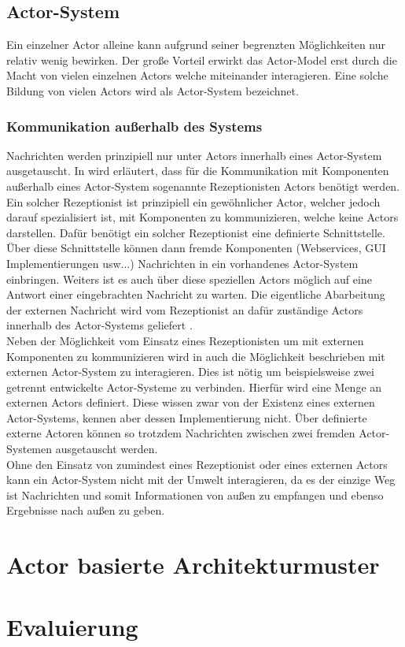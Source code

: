 \subsection{Actor-System}\label{actor:actorSystem}
Ein einzelner Actor alleine kann aufgrund seiner begrenzten Möglichkeiten nur relativ wenig bewirken. Der große Vorteil erwirkt das Actor-Model erst durch die Macht von vielen einzelnen Actors welche miteinander interagieren. Eine solche Bildung von vielen Actors wird als Actor-System bezeichnet.\citep{Agha1985ActorsSystems}
\subsubsection{Kommunikation außerhalb des Systems}
Nachrichten werden prinzipiell nur unter Actors innerhalb eines Actor-System ausgetauscht. In \cite{Agha1985ActorsSystems} wird erläutert, dass für die Kommunikation mit Komponenten außerhalb eines Actor-System sogenannte Rezeptionisten Actors benötigt werden.\\
Ein solcher Rezeptionist ist prinzipiell ein gewöhnlicher Actor, welcher jedoch darauf spezialisiert ist, mit Komponenten  zu kommunizieren, welche keine Actors darstellen. Dafür benötigt ein solcher Rezeptionist eine definierte Schnittstelle. Über diese Schnittstelle können dann fremde Komponenten (Webservices, GUI Implementierungen  usw...) Nachrichten in ein vorhandenes Actor-System einbringen. Weiters ist es auch über diese speziellen Actors möglich auf eine Antwort einer eingebrachten Nachricht zu warten. Die eigentliche Abarbeitung der externen Nachricht wird vom Rezeptionist an dafür zuständige Actors innerhalb des Actor-Systems geliefert \citep{Agha1985ActorsSystems}.\\
Neben der Möglichkeit vom Einsatz eines Rezeptionisten um mit externen Komponenten zu kommunizieren wird in \cite{Agha1985ActorsSystems} auch die Möglichkeit beschrieben mit externen Actor-System zu interagieren. Dies ist nötig um beispielsweise zwei getrennt entwickelte Actor-Systeme zu verbinden. Hierfür wird eine Menge an externen Actors definiert. Diese wissen zwar von der Existenz eines externen Actor-Systems, kennen aber dessen Implementierung nicht. Über definierte externe Actoren können so trotzdem Nachrichten zwischen zwei fremden Actor-Systemen ausgetauscht werden. \\
Ohne den Einsatz von zumindest eines Rezeptionist oder eines externen Actors kann ein Actor-System nicht mit der Umwelt interagieren, da es der einzige Weg ist Nachrichten und somit Informationen von außen zu empfangen und ebenso Ergebnisse nach außen zu geben. 





\section{Actor basierte Architekturmuster}
\label{theory:actorArchitecture}
\section{Evaluierung}
